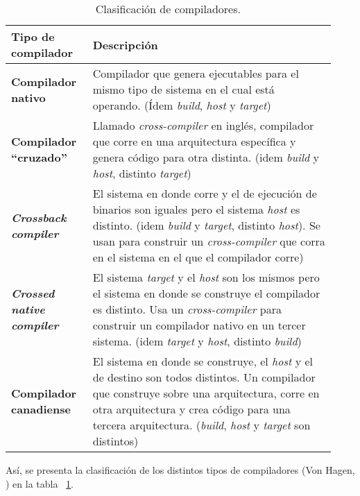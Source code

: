     \begin{table}[t]
        \centering
            \caption{Clasificación de compiladores.}
            \label{tab:TiposCompiladores}
            \begin{tabular}{ | p{0.23\linewidth} | p{0.7\linewidth} | }
                \hline
                \textbf{Tipo de compilador}  & \textbf{Descripción}  \\ \hline
                \textbf{Compilador nativo}  & Compilador que genera  ejecutables para el mismo tipo de sistema en  el cual está operando. (Ídem \emph{build}, \emph{host} y \emph{target})  \\ \hline
                \raggedright \textbf{Compilador “cruzado”}  & Llamado \emph{cross-compiler} en inglés, compilador que corre en una arquitectura específica y genera código para otra distinta. (idem \emph{build} y \emph{host}, distinto \emph{target})   \\ \hline
                \textbf{\emph{Crossback compiler}}    & El sistema en donde corre y el de ejecución de binarios son iguales pero el sistema \emph{host} es distinto. (idem \emph{build} y \emph{target}, distinto \emph{host}).  Se usan para construir un \emph{cross-compiler} que corra en el sistema en el que el compilador corre)  \\ \hline
                \textbf{\emph{Crossed native compiler}}    & El sistema \emph{target} y el \emph{host} son los mismos pero el sistema en donde se construye el compilador es distinto. Usa un \emph{cross-compiler} para construir un compilador nativo en un tercer sistema. (idem \emph{target} y \emph{host}, distinto \emph{build})  \\ \hline
                \raggedright \textbf{Compilador canadiense}    &   El sistema en donde se construye, el \emph{host} y el de destino son todos distintos. Un compilador que construye sobre una arquitectura, corre en otra arquitectura y crea código para una tercera arquitectura. (\emph{build}, \emph{host} y \emph{target} son distintos)   \\ \hline
            \end{tabular}
        \par
    \end{table}

    Así, se presenta la clasificación de los distintos tipos de compiladores (Von Hagen, \cite{von_hagen_definitive_2006}) en la tabla ~\ref{tab:TiposCompiladores}.



